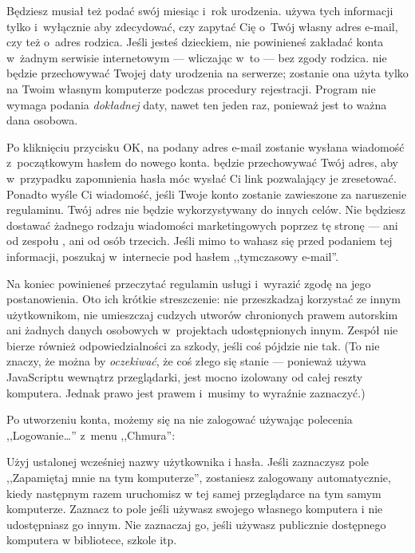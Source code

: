 \documentclass[a4paper]{report}
\begin{document}
Będziesz musiał też podać swój miesiąc i~rok urodzenia. \Snap{} używa tych informacji tylko i~wyłącznie aby zdecydować, czy zapytać Cię o~Twój własny adres e-mail, czy też o~adres rodzica. Jeśli jesteś dzieckiem, nie powinieneś zakładać konta w~żadnym serwisie internetowym --- wliczając w~to  --- bez zgody rodzica. \Snap{} nie będzie przechowywać Twojej daty urodzenia na serwerze; zostanie ona użyta tylko na Twoim własnym komputerze podczas procedury rejestracji. Program nie wymaga podania \emph{dokładnej} daty, nawet ten jeden raz, ponieważ jest to ważna dana osobowa.

Po kliknięciu przycisku OK, na podany adres e-mail zostanie wysłana wiadomość z~początkowym hasłem do nowego konta. \Snap{} będzie przechowywać Twój adres, aby w~przypadku zapomnienia hasła móc wysłać Ci link pozwalający je zresetować. Ponadto \Snap{} wyśle Ci wiadomość, jeśli Twoje konto zostanie zawieszone za naruszenie regulaminu. Twój adres nie będzie wykorzystywany do innych celów. Nie będziesz dostawać żadnego rodzaju wiadomości marketingowych poprzez tę stronę --- ani od zespołu , ani od osób trzecich. Jeśli mimo to wahasz się przed podaniem tej informacji, poszukaj w~internecie pod hasłem ,,tymczasowy e-mail''.

Na koniec powinieneś przeczytać regulamin usługi i~wyrazić zgodę na jego postanowienia. Oto ich krótkie streszczenie: nie przeszkadzaj korzystać ze  innym użytkownikom, nie umieszczaj cudzych utworów chronionych prawem autorskim ani żadnych danych osobowych w~projektach udostępnionych innym. Zespół  nie bierze również odpowiedzialności za szkody, jeśli coś pójdzie nie tak. (To nie znaczy, że można by \emph{oczekiwać}, że coś złego się stanie --- ponieważ \Snap{} używa JavaScriptu wewnątrz przeglądarki, jest mocno izolowany od całej reszty komputera. Jednak prawo jest prawem i~musimy to wyraźnie zaznaczyć.)

Po utworzeniu konta, możemy się na nie zalogować używając polecenia ,,Logowanie\ldots'' z~menu ,,Chmura'':\nopagebreak


Użyj ustalonej wcześniej nazwy użytkownika i hasła. Jeśli zaznaczysz pole ,,Zapamiętaj mnie na tym komputerze'', zostaniesz zalogowany automatycznie, kiedy następnym razem uruchomisz  w tej samej przeglądarce na tym samym komputerze. Zaznacz to pole jeśli używasz swojego własnego komputera i nie udostępniasz go innym. Nie zaznaczaj go, jeśli używasz publicznie dostępnego komputera w bibliotece, szkole itp.
\end{document}
